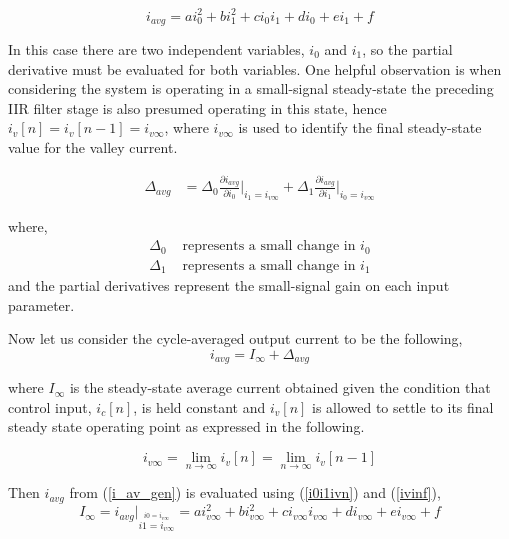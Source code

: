 \documentclass[conference]{IEEEtran}
\begin{document}
\begin{equation}
i_{avg} = a i_0^2+b i_1^2+c i_0i_1+d i_0+e i_1+f  \label{i_av_gen}
\end{equation}

In this case there are two independent variables, $i_0$ and $i_1$, so the partial derivative must be evaluated for both variables. One helpful observation is when considering the system is operating in a small-signal steady-state the preceding IIR filter stage is also presumed operating in this state, hence $i_v[n] = i_v[n-1] = i_{v\infty}$, where $i_{v\infty}$ is used to identify the final steady-state value for the valley current.

\begin{align}
\Delta{_{avg}} &= \Delta{_0}\frac{\partial i_{avg}}{\partial i_0}\bigg|_{i_1=i_{v\infty}} + \Delta{_1}\frac{\partial i_{avg}}{\partial i_1}\bigg|_{i_0=i_{v\infty}} 
  \label{i_av_deriv}
\end{align}

where,
\begin{align}
	\Delta_0 & \text{ represents a small change in } i_0 \nonumber \\
	\Delta_1 & \text{ represents a small change in } i_1 
	\label{deltai0i1}
\end{align}
and the partial derivatives represent the small-signal gain on each input parameter.

Now let us consider the cycle-averaged output current to be the following,
\begin{equation}	
	i_{avg} = I_{\infty} + \Delta_{avg}
\end{equation}

where $I_{\infty}$ is the steady-state average current obtained given the condition that control input, $i_c[n]$, is held constant and $i_v[n]$ is allowed to settle to its final steady state operating point as expressed in the following.

\begin{equation}
	i_{v\infty} = \lim_{n \to \infty} i_{v}[n] = \lim_{n \to \infty}  i_{v}[n-1]
	\label{ivinf}
\end{equation}

Then $i_{avg}$ from (\ref{i_av_gen}) is evaluated using (\ref{i0i1ivn}) and (\ref{ivinf}),
\begin{equation}
	I_{\infty} = i_{avg} \bigg|_{\stackrel{i0=i_{v \infty}}{i1=i_{v \infty}}} = a i_{v \infty}^2+b i_{v \infty}^2+c i_{v \infty}i_{v \infty}+d i_{v \infty}+e i_{v \infty}+f 
\end{equation}
\end{document}
